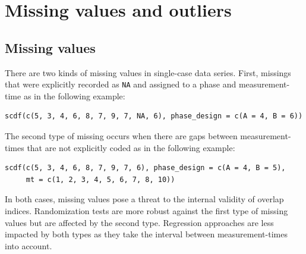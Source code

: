 \documentclass[
  letterpaper,
  DIV=11,
  numbers=noendperiod]{scrreprt}
\begin{document}
\hypertarget{missing-values-and-outliers}{%
\chapter{Missing values and
outliers}\label{missing-values-and-outliers}}

\hypertarget{missing-values}{%
\section{Missing values}\label{missing-values}}

There are two kinds of missing values in single-case data series. First,
missings that were explicitly recorded as \texttt{NA} and assigned to a
phase and measurement-time as in the following example:

\begin{verbatim}
scdf(c(5, 3, 4, 6, 8, 7, 9, 7, NA, 6), phase_design = c(A = 4, B = 6))
\end{verbatim}

The second type of missing occurs when there are gaps between
measurement-times that are not explicitly coded as in the following
example:

\begin{verbatim}
scdf(c(5, 3, 4, 6, 8, 7, 9, 7, 6), phase_design = c(A = 4, B = 5), 
     mt = c(1, 2, 3, 4, 5, 6, 7, 8, 10))
\end{verbatim}

In both cases, missing values pose a threat to the internal validity of
overlap indices. Randomization tests are more robust against the first
type of missing values but are affected by the second type. Regression
approaches are less impacted by both types as they take the interval
between measurement-times into account.
\end{document}
